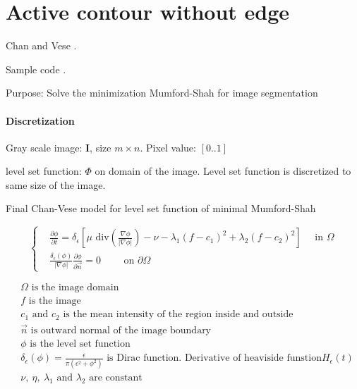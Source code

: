 \chapter{Active contour without edge}

Chan and Vese \cite{Chan2001}.

Sample code \cite{Getreuer2012}.

Purpose: Solve the minimization Mumford-Shah for image segmentation


\subsubsection{Discretization}

Gray scale image: $\mathbf{I}$, size $m \times n$. Pixel value: $[0..1]$

level set function: $\Phi$ on domain of the image. Level set function is discretized to same size of the image.

Final Chan-Vese model for level set function of minimal Mumford-Shah

\begin{equation}
    \left\{ 
        \begin{aligned}
        & \frac{\partial \phi}{\partial t} = 
                \delta_{\epsilon} \left[
                \mu \text{ div} \left( \frac{\nabla \phi}{|\nabla \phi|} \right) - 
                \nu - 
                \lambda_1 (f-c_1)^2 +
                \lambda_2 (f-c_2)^2
                \right] \quad \text{ in } \Omega\\
        & \frac{\delta_{\epsilon}(\phi)}{|\nabla \phi|} 
            \frac{\partial \phi}{\partial \overrightarrow{n}}
            = 0
            \qquad \text{ on } \partial \Omega
        \end{aligned}
    \right.
\end{equation}

\begin{equation}
    \begin{aligned}
        & 	\Omega \text{ is the image domain } \\
        & 	f \text{ is the image} \\
        &	c_1 \text{ and } c_2 \text{ is the mean intensity of the region inside and outside} \\
        & 	\overrightarrow{n} 
            \text{ is outward normal of the image boundary} \\
        & 	\phi 
            \text{ is the level set function} \\
        & 	\delta_{\epsilon}(\phi) = \frac{\epsilon}{\pi (\epsilon^2 + \phi^2)} 
            \text{ is Dirac function. Derivative of heaviside funstion} H_{\epsilon}(t) \\
        & \nu,\ \eta,\ \lambda_1 \text{ and } \lambda_2 \text{ are constant}
    \end{aligned}
\end{equation}

